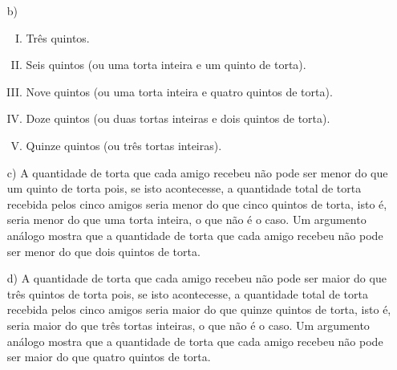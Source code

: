 \begin{multicols}{2}
\begin{solucao}{}{}
\begin{enumerate} [\quad a)]
\begin{center}
\end{center}

    \item[b)]
\begin{enumerate}[I)]
          \item Três quintos.
          \item Seis quintos (ou uma torta inteira e um quinto de torta).
          \item Nove quintos (ou uma torta inteira e quatro quintos de torta).
          \item Doze quintos (ou duas tortas inteiras e dois quintos de torta).
          \item Quinze quintos (ou três tortas inteiras).
\end{enumerate}

    \item[c)]     A quantidade de torta que cada amigo recebeu não pode ser menor do que um quinto de torta pois, se isto acontecesse, a quantidade total de torta recebida pelos cinco amigos seria menor do que cinco quintos de torta, isto é, seria menor do que uma torta inteira, o que não é o caso. Um argumento análogo mostra que a quantidade de torta que cada amigo recebeu não pode ser menor do que dois quintos de torta.
    \item[d)]       A quantidade de torta que cada amigo recebeu não pode ser maior do que três quintos de torta pois, se isto acontecesse, a quantidade total de torta recebida pelos cinco amigos seria maior do que quinze quintos de torta, isto é, seria maior do que três tortas inteiras, o que não é o caso. Um argumento análogo mostra que a quantidade de torta que cada amigo recebeu não pode ser maior do que quatro quintos de torta.
\end{enumerate} %


\end{solucao}




\end{multicols}
